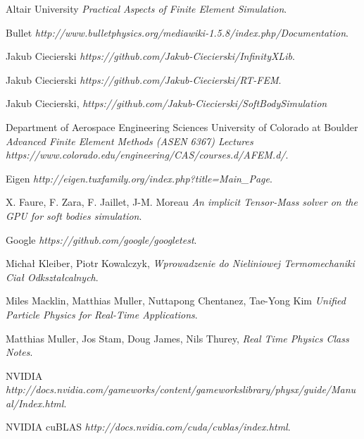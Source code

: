 \documentclass[en]{minipw} %
\begin{document}
\renewcommand{\bibname}{References}
\begin{thebibliography}{25}%


 Altair University \emph{Practical Aspects of Finite Element Simulation}.

 Bullet \emph{http://www.bulletphysics.org/mediawiki-1.5.8/index.php/Documentation}.

 Jakub Ciecierski \emph{https://github.com/Jakub-Ciecierski/InfinityXLib}.

 Jakub Ciecierski \emph{https://github.com/Jakub-Ciecierski/RT-FEM}.

 Jakub Ciecierski, \emph{https://github.com/Jakub-Ciecierski/SoftBodySimulation}

 Department of Aerospace Engineering Sciences University of Colorado at Boulder \emph{Advanced Finite Element Methods (ASEN 6367) Lectures https://www.colorado.edu/engineering/CAS/courses.d/AFEM.d/}.

 Eigen \emph{http://eigen.tuxfamily.org/index.php?title=Main\_Page}.

 X. Faure, F. Zara, F. Jaillet, J-M. Moreau  \emph{An implicit Tensor-Mass solver on the GPU for soft bodies simulation}.

 Google \emph{https://github.com/google/googletest}.

 Michał Kleiber, Piotr Kowalczyk, \emph{Wprowadzenie do Nieliniowej Termomechaniki Ciał Odkształcalnych}.


 Miles Macklin, Matthias Muller, Nuttapong Chentanez, Tae-Yong Kim \emph{Unified Particle Physics for Real-Time Applications}.

 Matthias Muller, Jos Stam, Doug James, Nils Thurey, \emph{Real Time Physics Class Notes}.


 NVIDIA \emph{http://docs.nvidia.com/gameworks/content/gameworkslibrary/physx/guide/Manual/Index.html}.

 NVIDIA cuBLAS \emph{http://docs.nvidia.com/cuda/cublas/index.html}.


\end{thebibliography}
\end{document}
